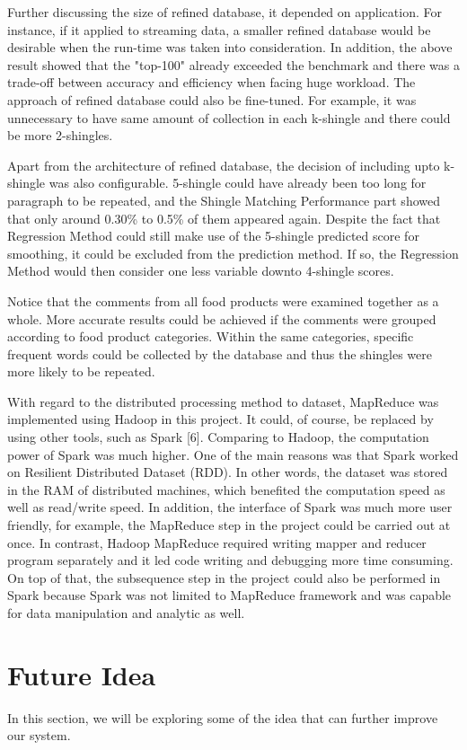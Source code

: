 Further discussing the size of refined database, it depended on application. For instance, if it applied to streaming data, a smaller refined database would be desirable when the run-time was taken into consideration. In addition, the above result showed that the "top-100" already exceeded the benchmark and there was a trade-off between accuracy and efficiency when facing huge workload. The approach of refined database could also be fine-tuned. For example, it was unnecessary to have same amount of collection in each k-shingle and there could be more 2-shingles. 

Apart from the architecture of refined database, the decision of including upto k-shingle was also configurable. 5-shingle could have already been too long for paragraph to be repeated, and the Shingle Matching Performance part showed that only around 0.30\% to 0.5\% of them appeared again. Despite the fact that Regression Method could still make use of the 5-shingle predicted score for smoothing, it could be excluded from the prediction method. If so, the Regression Method would then consider one less variable downto 4-shingle scores.

Notice that the comments from all food products were examined together as a whole. More accurate results could be achieved if the comments were grouped according to food product categories. Within the same categories, specific frequent words could be collected by the database and thus the shingles were more likely to be repeated.

With regard to the distributed processing method to dataset, MapReduce was implemented using Hadoop in this project. It could, of course, be replaced by using other tools, such as Spark [6]. Comparing to Hadoop, the computation power of Spark was much higher. One of the main reasons was that Spark worked on Resilient Distributed Dataset (RDD). In other words, the dataset was stored in the RAM of distributed machines, which benefited the computation speed as well as read/write speed. In addition, the interface of Spark was much more user friendly, for example, the MapReduce step in the project could be carried out at once. In contrast, Hadoop MapReduce required writing mapper and reducer program separately and it led code writing and debugging more time consuming. On top of that, the subsequence step in the project could also be performed in Spark because Spark was not limited to MapReduce framework and was capable for data manipulation and analytic as well. 


\section{Future Idea}
In this section, we will be exploring some of the idea that can further improve our system.
